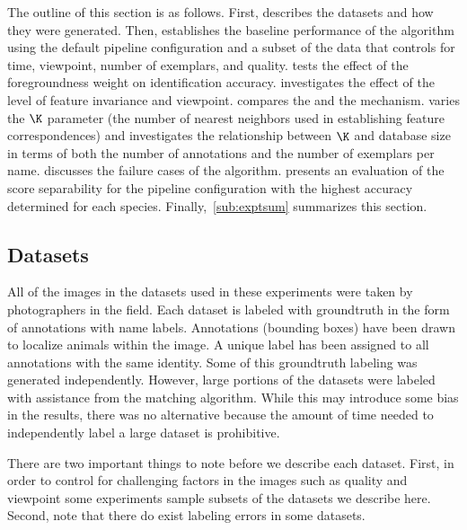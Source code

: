     The outline of this section is as follows.
    First,  describes the datasets and how they were generated.
    Then,  establishes the baseline performance of the algorithm using the default pipeline
      configuration and a subset of the data that controls for time, viewpoint, number of exemplars, and quality.
     tests the effect of the foregroundness weight on identification accuracy.
     investigates the effect of the level of feature invariance and viewpoint.
     compares the \csumprefix{} and the \nsumprefix{} \namescoring{} mechanism.
     varies the $\K$ parameter (the number of nearest neighbors used in establishing feature
      correspondences) and investigates the relationship between $\K$ and database size in terms of both the number
      of annotations and the number of exemplars per name.
     discusses the failure cases of the algorithm.
     presents an evaluation of the score separability for the pipeline configuration with the
      highest accuracy determined for each species.
    Finally,~\cref{sub:exptsum} summarizes this section.


    \subsection{Datasets}\label{sub:datasets}

        All of the images in the datasets used in these experiments were taken by photographers in the field.
        Each dataset is labeled with groundtruth in the form of annotations with name labels.
        Annotations (bounding boxes) have been drawn to localize animals within the image.
        A unique \name{} label has been assigned to all annotations with the same identity.
        Some of this groundtruth labeling was generated independently.
        However, large portions of the datasets were labeled with assistance from the matching algorithm.
        While this may introduce some bias in the results, there was no alternative because the amount of time
          needed to independently label a large dataset is prohibitive.

        There are two important things to note before we describe each dataset.
        First, in order to control for challenging factors in the images such as quality and viewpoint some
          experiments sample subsets of the datasets we describe here.
        Second, note that there do exist labeling errors in some datasets.

